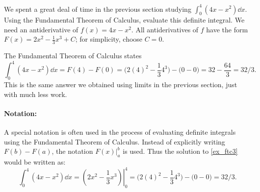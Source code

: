 
\begin{example}\label{ex_ftc3}%
We spent a great deal of time in the previous section studying $\int_0^4(4x-x^2)\dd x$. Using the Fundamental Theorem of Calculus, evaluate this definite integral.
\solution
We need an antiderivative of $f(x)=4x-x^2$. All antiderivatives of $f$ have the form $F(x) = 2x^2-\frac13x^3+C$; for simplicity, choose $C=0$.

The Fundamental Theorem of Calculus states
\[
\int_0^4(4x-x^2)\dd x = F(4)-F(0)
= \bigl(2(4)^2-\frac134^3\bigr)-\bigl(0-0\bigr) = 32-\frac{64}3 = 32/3.
\]
This is the same answer we obtained using limits in the previous section, just with much less work.
\end{example}

\paragraph{Notation:}%
A special notation is often used in the process of evaluating definite integrals using the Fundamental Theorem of Calculus. Instead of explicitly writing $F(b)-F(a)$, the notation $F(x)\Big|_a^b$ is used. Thus the solution to \autoref{ex_ftc3} would be written as:
\[
\int_0^4(4x-x^2)\dd x = \left.\left(2x^2-\frac13x^3\right)\right|_0^4
= \bigl(2(4)^2-\frac134^3\bigr)-\bigl(0-0\bigr) =  32/3.
\]

